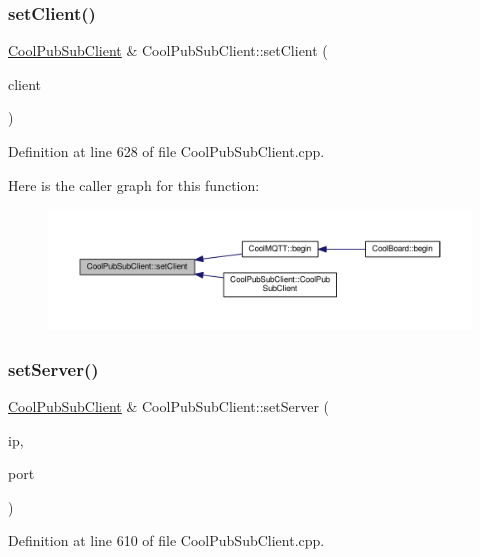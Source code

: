 \subsubsection{\texorpdfstring{set\+Client()}{setClient()}}
{\footnotesize\ttfamily \hyperlink{class_cool_pub_sub_client}{Cool\+Pub\+Sub\+Client} \& Cool\+Pub\+Sub\+Client\+::set\+Client (\begin{DoxyParamCaption}\item[{Client \&}]{client }\end{DoxyParamCaption})}



Definition at line 628 of file Cool\+Pub\+Sub\+Client.\+cpp.

Here is the caller graph for this function\+:\nopagebreak
\begin{figure}[H]
\begin{center}
\leavevmode
\includegraphics[width=350pt]{class_cool_pub_sub_client_a7ee119b786010561ab6a9afa0798e91d_icgraph}
\end{center}
\end{figure}
\mbox{\label{class_cool_pub_sub_client_a947e70c394c66c7d08d0c53caf8425e3}} 
\subsubsection{\texorpdfstring{set\+Server()}{setServer()}\hspace{0.1cm}{\footnotesize\ttfamily [1/3]}}
{\footnotesize\ttfamily \hyperlink{class_cool_pub_sub_client}{Cool\+Pub\+Sub\+Client} \& Cool\+Pub\+Sub\+Client\+::set\+Server (\begin{DoxyParamCaption}\item[{I\+P\+Address}]{ip,  }\item[{uint16\+\_\+t}]{port }\end{DoxyParamCaption})}



Definition at line 610 of file Cool\+Pub\+Sub\+Client.\+cpp.

